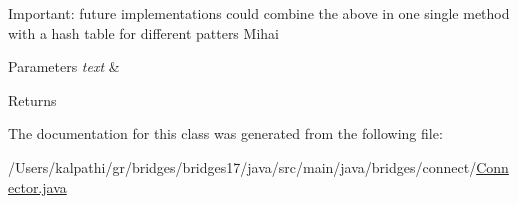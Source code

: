 Important\+: future implementations could combine the above in one single method with a hash table for different patters Mihai 
\begin{DoxyParams}{Parameters}
{\em text} & \\
\hline
\end{DoxyParams}
\begin{DoxyReturn}{Returns}

\end{DoxyReturn}


The documentation for this class was generated from the following file\+:\begin{DoxyCompactItemize}
\item 
/\+Users/kalpathi/gr/bridges/bridges17/java/src/main/java/bridges/connect/\hyperlink{_connector_8java}{Connector.\+java}\end{DoxyCompactItemize}
